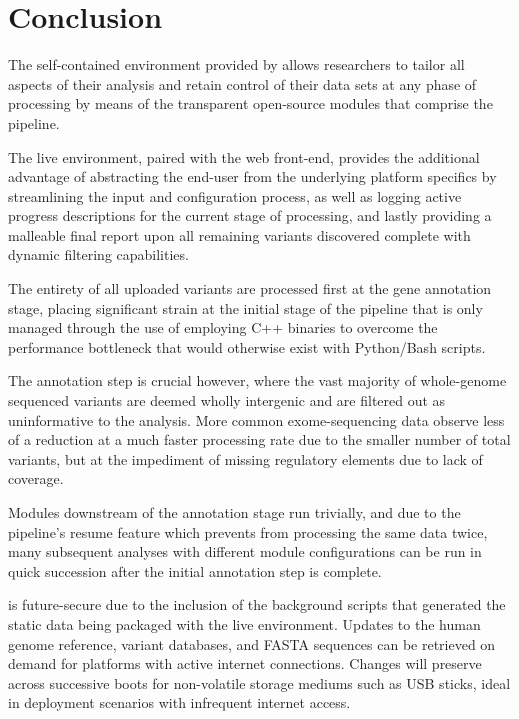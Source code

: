 \section{Conclusion}

The self-contained environment provided by \app allows researchers to tailor all aspects of their analysis and retain control of their data sets at any phase of processing by means of the transparent open-source modules that comprise the pipeline. 

The live environment, paired with the web front-end, provides the additional advantage of abstracting the end-user from the underlying platform specifics by streamlining the input and configuration process, as well as logging active progress descriptions for the current stage of processing, and lastly providing a malleable final report upon all remaining variants discovered complete with dynamic filtering capabilities.

The entirety of all uploaded variants are processed first at the gene annotation stage, placing significant strain at the initial stage of the pipeline that is only managed through the use of employing C++ binaries to overcome the performance bottleneck that would otherwise exist with Python/Bash scripts.

The annotation step is crucial however, where the vast majority of whole-genome sequenced variants are deemed wholly intergenic and are filtered out as uninformative to the analysis. More common exome-sequencing data observe less of a reduction at a much faster processing rate due to the smaller number of total variants, but at the impediment of missing regulatory elements due to lack of coverage.

Modules downstream of the annotation stage run trivially, and due to the pipeline's resume feature which prevents \app from processing the same data twice, many subsequent analyses with different module configurations can be run in quick succession after the initial annotation step is complete.

\app is future-secure due to the inclusion of the background scripts that generated the static data being packaged with the live environment. Updates to the human genome reference, variant databases, and FASTA sequences can be retrieved on demand for platforms with active internet connections. Changes will preserve across successive boots for non-volatile storage mediums such as USB sticks, ideal in deployment scenarios with infrequent internet access.

